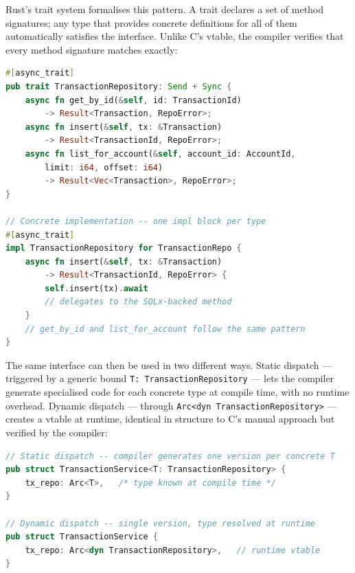 Rust's trait system formalises this pattern. A trait declares a set of
method signatures; any type that provides concrete definitions for all of
them automatically satisfies the interface. Unlike C's vtable, the compiler
verifies that every method signature matches exactly:

\begin{lstlisting}[language=Rust, caption={transaction.rs (service) ---
The trait defines the interface. \texttt{Send + Sync} bounds ensure that any
implementation can be shared safely across threads, replacing C's unverified
\texttt{void *ctx}.}]
#[async_trait]
pub trait TransactionRepository: Send + Sync {
    async fn get_by_id(&self, id: TransactionId)
        -> Result<Transaction, RepoError>;
    async fn insert(&self, tx: &Transaction)
        -> Result<TransactionId, RepoError>;
    async fn list_for_account(&self, account_id: AccountId,
        limit: i64, offset: i64)
        -> Result<Vec<Transaction>, RepoError>;
}

// Concrete implementation -- one impl block per type
#[async_trait]
impl TransactionRepository for TransactionRepo {
    async fn insert(&self, tx: &Transaction)
        -> Result<TransactionId, RepoError> {
        self.insert(tx).await   
        // delegates to the SQLx-backed method 
    }
    // get_by_id and list_for_account follow the same pattern
}
\end{lstlisting}

The same interface can then be used in two different ways. Static dispatch
--- triggered by a generic bound \texttt{T: TransactionRepository} --- lets
the compiler generate specialised code for each concrete type at compile
time, with no runtime overhead. Dynamic dispatch --- through
\texttt{Arc<dyn TransactionRepository>} --- creates a vtable at runtime,
identical in structure to C's manual approach but verified by the compiler:

\begin{lstlisting}[language=Rust, caption={Static dispatch vs dynamic
dispatch. The service uses generics for compile-time specialisation;
\texttt{dyn Trait} is available when the concrete type is unknown at
compile time.}]
// Static dispatch -- compiler generates one version per concrete T
pub struct TransactionService<T: TransactionRepository> {
    tx_repo: Arc<T>,   /* type known at compile time */
}

// Dynamic dispatch -- single version, type resolved at runtime
pub struct TransactionService {
    tx_repo: Arc<dyn TransactionRepository>,   // runtime vtable
}
\end{lstlisting}

